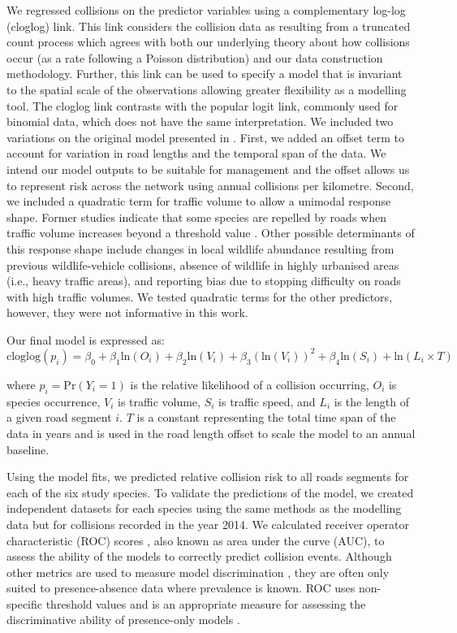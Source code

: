 We regressed collisions on the predictor variables using a complementary log-log (cloglog) link.  This link considers the collision data as resulting from a truncated count process which agrees with both our underlying theory about how collisions occur (as a rate following a Poisson distribution) and our data construction methodology. Further, this link can be used to specify a model that is invariant to the spatial scale of the observations allowing greater flexibility as a modelling tool. The cloglog link contrasts with the popular logit link, commonly used for binomial data, which does not have the same interpretation. We included two variations on the original model presented in . First, we added an offset term to account for variation in road lengths and the temporal span of the data. We intend our model outputs to be suitable for management and the offset allows us to represent risk across the network using annual collisions per kilometre. Second, we included a quadratic term for traffic volume to allow a unimodal response shape. Former studies indicate that some species are repelled by roads when traffic volume increases beyond a threshold value \citep[e.g.][]{seil05,gagn07}. Other possible determinants of this response shape include changes in local wildlife abundance resulting from previous wildlife-vehicle collisions, absence of wildlife in highly urbanised areas (i.e., heavy traffic areas), and reporting bias due to stopping difficulty on roads with high traffic volumes. We tested quadratic terms for the other predictors, however, they were not informative in this work.

Our final model is expressed as: 
\begin{equation}
\text{cloglog}(p_i) = \beta_0 + \beta_1 \text{ln}(O_i) + \beta_2 \text{ln}(V_i) + \beta_3 (\text{ln}(V_i))^2 + \beta_4 \text{ln}(S_i) + \text{ln}(L_i \times T)
\end{equation}

\noindent where $p_i=\text{Pr}(Y_i=1)$ is the relative likelihood of a collision occurring, $O_i$ is species occurrence, $V_i$ is traffic volume, $S_i$ is traffic speed, and $L_i$ is the length of a given road segment $i$. $T$ is a constant representing the total time span of the data in years and is used in the road length offset to scale the model to an annual baseline.

Using the model fits, we predicted relative collision risk to all roads segments for each of the six study species.  To validate the predictions of the model, we created independent datasets for each species using the same methods as the modelling data but for collisions recorded in the year 2014.  We calculated receiver operator characteristic (ROC) scores \citep{metz78}, also known as area under the curve (AUC), to assess the ability of the models to correctly predict collision events. Although other metrics are used to measure model discrimination \citep[e.g. true skill statistic (TSS), see][]{allo06}, they are often only suited to presence-absence data where prevalence is known. ROC uses non-specific threshold values and is an appropriate measure for assessing the discriminative ability of presence-only models \citep{laws14}. 

